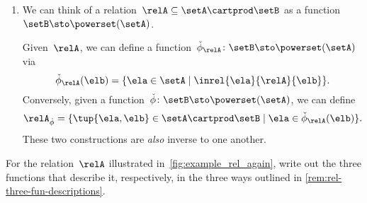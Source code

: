 \begin{enumerate}
        \item We can think of a relation~$\relA \subseteq \setA \cartprod \setB$ as a function~$\setB  \sto \powerset (\setA)$.

              Given~$\relA$, we can define a function~$\check \phi_{\relA} \colon \setB \sto \powerset (\setA)$ via
              \begin{equation}
                  \check \phi_{\relA} (\elb) = \{ \ela \in \setA \mid \inrel{\ela}{\relA}{\elb}\}.
              \end{equation}
              Conversely, given a function~$\check \phi \colon \setB \sto \powerset (\setA)$, we can define
              \begin{equation}
                  \relA_{\check \phi} = \{ \tup{\ela, \elb} \in \setA \cartprod \setB \mid \ela \in \check \phi_{\relA}(\elb)\}.
              \end{equation}
              These two constructions are \emph{also} inverse to one another.
    \end{enumerate}

\begin{marginfigure}
    \centering
    \caption{}
    \label{fig:example_rel_again}
\end{marginfigure}
\vfill
\begin{gradedexercise}
    \label{ex:Rel3Functions}
    For the relation~$\relA$ illustrated in~\cref{fig:example_rel_again}, write out the three functions that describe it, respectively, in the three ways outlined in \cref{rem:rel-three-fun-descriptions}.
\end{gradedexercise}

